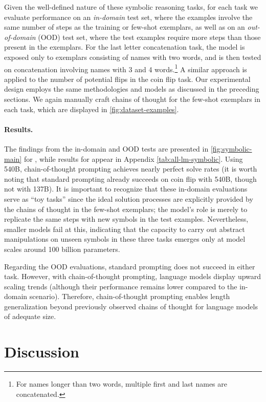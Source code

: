 Given the well-defined nature of these symbolic reasoning tasks, for each task we evaluate performance on an \textit{in-domain} test set, where the examples involve the same number of steps as the training or few-shot exemplars, as well as on an \textit{out-of-domain} (OOD) test set, where the test examples require more steps than those present in the exemplars. For the last letter concatenation task, the model is exposed only to exemplars consisting of names with two words, and is then tested on concatenation involving names with 3 and 4 words.\footnote{For names longer than two words, multiple first and last names are concatenated.} A similar approach is applied to the number of potential flips in the coin flip task. Our experimental design employs the same methodologies and models as discussed in the preceding sections. We again manually craft chains of thought for the few-shot exemplars in each task, which are displayed in \cref{fig:dataset-examples}.

\paragraph{Results.}
The findings from the in-domain and OOD tests are presented in \cref{fig:symbolic-main} for \palm{}, while results for \lamda{} appear in Appendix \cref{tab:all-lm-symbolic}. Using \palm{} 540B, chain-of-thought prompting achieves nearly perfect solve rates (it is worth noting that standard prompting already succeeds on coin flip with \palm{} 540B, though not with \lamda{} 137B). It is important to recognize that these in-domain evaluations serve as ``toy tasks'' since the ideal solution processes are explicitly provided by the chains of thought in the few-shot exemplars; the model's role is merely to replicate the same steps with new symbols in the test examples. Nevertheless, smaller models fail at this, indicating that the capacity to carry out abstract manipulations on unseen symbols in these three tasks emerges only at model scales around 100 billion parameters.

Regarding the OOD evaluations, standard prompting does not succeed in either task. However, with chain-of-thought prompting, language models display upward scaling trends (although their performance remains lower compared to the in-domain scenario). Therefore, chain-of-thought prompting enables length generalization beyond previously observed chains of thought for language models of adequate size.

\section{Discussion}\label{sec:discussion}

